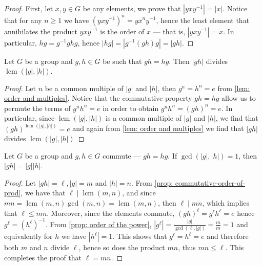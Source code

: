 \begin{proof}
  First, let \(x, y \in G\) be any elements, we prove that \(|y x y^{-1}| =
  |x|\). Notice that for any \(n \geq 1\) we have \((y x y^{-1})^n = y x^n
  y^{-1}\), hence the least element that annihilates the product \(y x y^{-1}\)
  is the order of \(x\) --- that is, \(|y x y^{-1}| = x\). In particular, \(hg =
  g^{-1} gh g\), hence \(|hg| = |g^{-1} (gh) g| = |gh|\).
\end{proof}

\begin{proposition}\label{prop: commutative-order-of-prod}
  Let \(G\) be a group and \(g, h \in G\) be such that \(g h = h g\). Then \(|g
  h|\) divides \(\operatorname{lcm}(|g|, |h|)\).
\end{proposition}

\begin{proof}
  Let \(n\) be a common multiple of \(|g|\) and \(|h|\), then \(g^n = h^n = e\)
  from \cref{lem: order and multiples}. Notice that the commutative property \(g
  h = h g\) allow us to permute the terms of \(g^n h^n = e\) in order to obtain
  \(g^n h^n = (g h)^n = e\). In particular, since \(\operatorname{lcm}(|g|,
  |h|)\) is a common multiple of \(|g|\) and \(|h|\), we find that \((g
  h)^{\operatorname{lcm}(|g|, |h|)} = e\) and again from \cref{lem: order and
  multiples} we find that \(|g h|\) divides \(\operatorname{lcm}(|g|, |h|)\)
\end{proof}

\begin{lemma}\label{lem: ord-prod-rel-prime}
  Let \(G\) be a group and \(g, h \in G\) commute --- \(gh = hg\). If
  \(\operatorname{gcd}(|g|, |h|) = 1\), then \(|gh| = |g| |h|\).
\end{lemma}

\begin{proof}
  Let \(|gh| = \ell, |g| = m\) and \(|h| = n\). From \cref{prop:
  commutative-order-of-prod}, we have that \(\ell \mid \operatorname{lcm}(m,
  n)\), and since \(m n = \operatorname{lcm}(m, n) \operatorname{gcd}(m, n) =
  \operatorname{lcm}(m, n)\), then \(\ell \mid mn\), which implies that \(\ell
  \leq mn\). Moreover, since the elements commute, \((g h)^\ell = g^\ell h^\ell
  = e\) hence \(g^\ell = (h^\ell)^{-1}\). From \cref{prop: order of the power},
  \(|g^\ell| = \frac{|g|}{\operatorname{gcd}(\ell, |g|)} = \frac m m = 1 \) and
  equivalently for \(h\) we have \(|h^\ell| = 1\). This shows that \(g^\ell =
  h^\ell = e\) and therefore both \(m\) and \(n\) divide \(\ell\), hence so does
  the product \(mn\), thus \(mn \leq \ell\). This completes the proof that
  \(\ell = mn\).
\end{proof}

